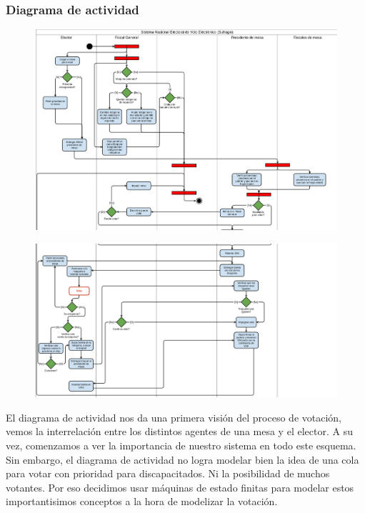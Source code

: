 \subsubsection{Diagrama de actividad}
\begin{figure}[h!]
\centering
\includegraphics[scale=0.5]{imagenes/actividad/actividadSufragio1}
\end{figure}

\begin{figure}[h!]
\centering
\includegraphics[scale=0.5]{imagenes/actividad/actividadSufragio2}
\end{figure}

El diagrama de actividad nos da una primera visión del proceso de votación, vemos la interrelación entre los distintos agentes de una mesa y el elector. A su vez, comenzamos a ver la importancia de nuestro sistema en todo este esquema. Sin embargo, el diagrama de actividad no logra modelar bien la idea de una cola para votar con prioridad para discapacitados. Ni la posibilidad de muchos votantes. Por eso decidimos usar máquinas de estado finitas para modelar estos importantisimos conceptos a la hora de modelizar la votación.

